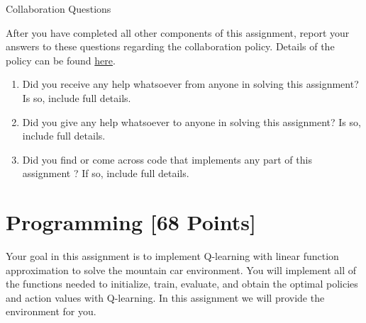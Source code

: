 \documentclass[11pt,addpoints,answers]{exam}
\begin{document}
\begin{questions}

\clearpage

{\Large Collaboration Questions}

After you have completed all other components of this assignment, report your answers to these questions regarding the collaboration policy. Details of the policy can be found \href{https://www.cs.cmu.edu/~10601/#policies}{here}.
\begin{enumerate}
    \item Did you receive any help whatsoever from anyone in solving this assignment? Is so, include full details.
    \item Did you give any help whatsoever to anyone in solving this assignment? Is so, include full details.
    \item Did you find or come across code that implements any part of this assignment ? If so, include full details.
\end{enumerate}

\begin{your_solution}[title=Answer,height=10cm,width=15cm]
\end{your_solution}\newpage
\end{questions}

\section{Programming [68 Points]}
\label{sec:code}

Your goal in this assignment is to implement Q-learning with linear function approximation to solve the mountain car environment. You will implement all of the functions needed to initialize, train, evaluate, and obtain the optimal policies and action values with Q-learning. In this assignment we will provide the environment for you.
\end{document}
